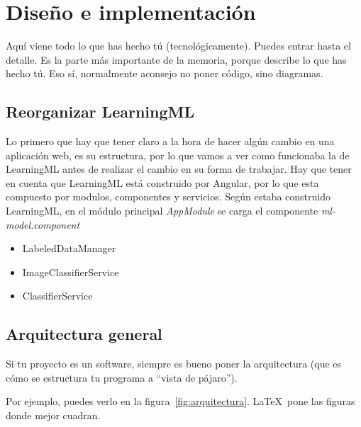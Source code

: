 \documentclass[a4paper, 12pt]{book}
\begin{document}

\cleardoublepage
\chapter{Diseño e implementación}

Aquí viene todo lo que has hecho tú (tecnológicamente). 
Puedes entrar hasta el detalle. 
Es la parte más importante de la memoria, porque describe lo que has hecho tú.
Eso sí, normalmente aconsejo no poner código, sino diagramas.

\section{Reorganizar LearningML} 
\label{sec:reorganizar}

Lo primero que hay que tener claro a la hora de hacer algún cambio en una aplicación web, es su estructura, por lo que vamos a ver como funcionaba la de LearningML antes de realizar el cambio en su forma de trabajar. Hay que tener en cuenta que LearningML está construido por Angular, por lo que esta compuesto por modulos, componentes y servicios. Según estaba construido LearningML, en el módulo principal  \emph{AppModule} se carga el componente  \emph{ml-model.component} 

\begin{itemize}
  
	\item LabeledDataManager
 
	\item ImageClassifierService

	\item ClassifierService

\end{itemize}

\section{Arquitectura general} 
\label{sec:arquitectura}

Si tu proyecto es un software, siempre es bueno poner la arquitectura (que es cómo se estructura tu programa a ``vista de pájaro'').

Por ejemplo, puedes verlo en la figura~\ref{fig:arquitectura}.
\LaTeX \ pone las figuras donde mejor cuadran. 
\end{document}
